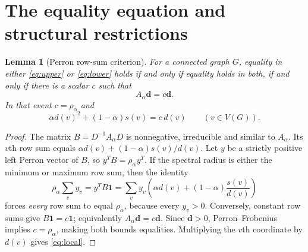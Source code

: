 \documentclass[11pt]{amsart}
\newtheorem{lemma}[theorem]{Lemma}
\theoremstyle{remark}
\newcommand{\dd}{\boldsymbol{d}}
\newcommand{\one}{\boldsymbol{1}}
\begin{document}
\section{The equality equation and structural restrictions}
\begin{lemma}[Perron row-sum criterion]\label{lem:rows}
For a connected graph $G$, equality in either \eqref{eq:upper} or
\eqref{eq:lower} holds if and only if equality holds in both, if and only if
there is a scalar $c$ such that
\begin{equation}\label{eq:eigenvector}
 A_\alpha\dd=c\dd.
\end{equation}
In that event $c=\rho_\alpha$ and
\begin{equation}\label{eq:local}
 \alpha d(v)^2+(1-\alpha)s(v)=c\,d(v)
 \qquad(v\in V(G)).
\end{equation}
\end{lemma}
\begin{proof}
The matrix $B=D^{-1}A_\alpha D$ is nonnegative, irreducible and similar to
$A_\alpha$. Its $v$th row sum equals
$\alpha d(v)+(1-\alpha)s(v)/d(v)$. Let $y$ be a strictly positive left
Perron vector of $B$, so $y^TB=\rho_\alpha y^T$. If the spectral radius
is either the minimum or maximum row sum, then the identity
\[
 \rho_\alpha\sum_v y_v
  =y^TB\one=\sum_v y_v\left(\alpha d(v)
                  +(1-\alpha)\frac{s(v)}{d(v)}\right)
\]
forces \emph{every} row sum to equal $\rho_\alpha$, because every $y_v>0$.
Conversely, constant row sums give $B\one=c\one$; equivalently
$A_\alpha\dd=c\dd$. Since $\dd>0$, Perron--Frobenius implies
$c=\rho_\alpha$, making both bounds equalities. Multiplying the $v$th
coordinate by $d(v)$ gives \eqref{eq:local}.
\end{proof}
\end{document}
